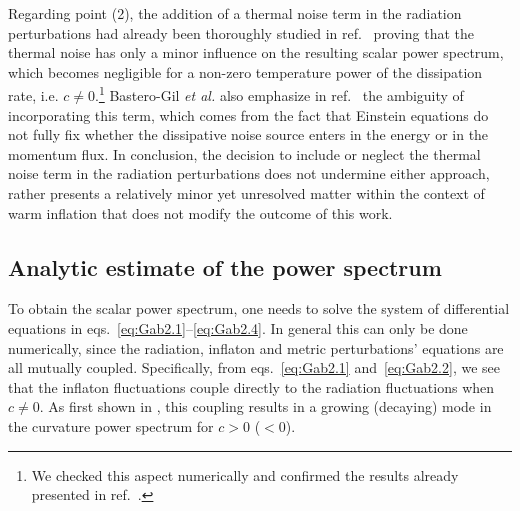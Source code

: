 \documentclass[a4paper,11pt]{article}
\begin{document}
Regarding point (2), the addition of a thermal noise term in the radiation perturbations had already been thoroughly studied in ref.~\cite{Bastero-Gil:2014jsa} proving that the thermal noise has only a minor influence on the resulting scalar power spectrum, which becomes negligible for a non-zero temperature power of the dissipation rate, i.e. $c\neq 0$.\footnote{We checked this aspect numerically and confirmed the results already presented in ref.~\cite{Bastero-Gil:2014jsa}.} Bastero-Gil {\it et al.} also emphasize in ref.~\cite{Bastero-Gil:2014jsa} the ambiguity of incorporating this term, which comes from the fact that Einstein equations do not fully fix whether the dissipative noise source enters in the energy or in the momentum flux. In conclusion, the decision to include or neglect the thermal noise term in the radiation perturbations does not undermine either approach, rather presents a relatively minor yet unresolved matter within the context of warm inflation that does not modify the outcome of this work.


\subsection{Analytic estimate of the power spectrum \label{sec:analytic_estimate}}

To obtain the scalar power spectrum, one  needs to solve the system of differential equations in eqs.~\eqref{eq:Gab2.1}--\eqref{eq:Gab2.4}. In general this can only be done numerically, since the radiation, inflaton and metric perturbations' equations are all mutually coupled. Specifically, from eqs.~\eqref{eq:Gab2.1} and~\eqref{eq:Gab2.2}, we see that the inflaton fluctuations couple directly to the radiation fluctuations when $c\neq 0$. As first shown in \cite{Graham:2009bf}, this coupling results in a growing (decaying) mode in the curvature power spectrum for $c>0$ ($<0$).
\end{document}
